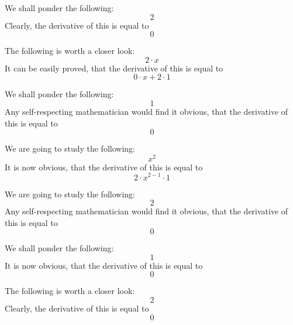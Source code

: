 \documentclass{article}
\begin{document}
We shall ponder the following:
\begin{equation}
2 
\end{equation}
Clearly, the derivative of this is equal to
\begin{equation}
0 
\end{equation}

The following is worth a closer look:
\begin{equation}
2 \cdot x 
\end{equation}
It can be easily proved, that the derivative of this is equal to
\begin{equation}
0 \cdot x + 2 \cdot 1 
\end{equation}

We shall ponder the following:
\begin{equation}
1 
\end{equation}
Any self-respecting mathematician would find it obvious, that the derivative of this is equal to
\begin{equation}
0 
\end{equation}

We are going to study the following:
\begin{equation}
x ^{2 } 
\end{equation}
It is now obvious, that the derivative of this is equal to
\begin{equation}
2 \cdot x ^{2 - 1 } \cdot 1 
\end{equation}

We are going to study the following:
\begin{equation}
2 
\end{equation}
Any self-respecting mathematician would find it obvious, that the derivative of this is equal to
\begin{equation}
0 
\end{equation}

We shall ponder the following:
\begin{equation}
1 
\end{equation}
It is now obvious, that the derivative of this is equal to
\begin{equation}
0 
\end{equation}

The following is worth a closer look:
\begin{equation}
2 
\end{equation}
Clearly, the derivative of this is equal to
\begin{equation}
0 
\end{equation}
\end{document}
